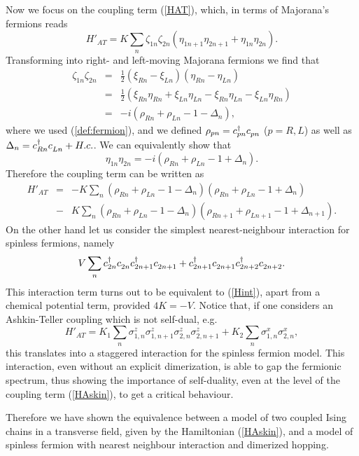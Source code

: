 Now we focus on the coupling term (\ref{HAT}), which, in terms of
Majorana's fermions reads
\[
H'_{AT} = K\sum_n \zeta_{1n}\zeta_{2n}\left(
\eta_{1n+1}\eta_{2n+1}+ \eta_{1n}\eta_{2n}\right).
\]
Transforming into right- and left-moving Majorana fermions we find that
\begin{eqnarray*}
\zeta_{1n}\zeta_{2n} &=& \frac{1}{2}
\left(\xi_{Rn}-\xi_{Ln}\right)
\left(\eta_{Rn}-\eta_{Ln}\right)\\
&=&\frac{1}{2}\left(\xi_{Rn}\eta_{Rn}+\xi_{Ln}\eta_{Ln}
-\xi_{Rn}\eta_{Ln}-\xi_{Ln}\eta_{Rn}\right)\\
&=&-i\left(\rho_{Rn}+\rho_{Ln}-1-\Delta_n\right),
\end{eqnarray*}
where we used (\ref{def:fermion}), and we defined
$\rho_{pn}=c^\dagger_{pn}c^\pdag_{pn}$ ($p=R,L$) as well as
$\Delta_n = c^\dagger_{Rn}c^\pdag_{Ln} + H.c.$.
We can equivalently show that
\[
\eta_{1n}\eta_{2n} = -i\left(\rho_{Rn}+\rho_{Ln}-1+\Delta_n\right).
\]
Therefore the coupling term can be written as
\begin{eqnarray}
H'_{AT} &=& - K\sum_n\left(\rho_{Rn}+\rho_{Ln}-1-\Delta_n\right)
\left(\rho_{Rn}+\rho_{Ln}-1+\Delta_n\right) \nonumber\\
&-& K\sum_n \left(\rho_{Rn}+\rho_{Ln}-1-\Delta_n\right)
\left(\rho_{Rn+1}+\rho_{Ln+1}-1+\Delta_{n+1}\right).
\label{Hint}
\end{eqnarray}
On the other hand let us consider the simplest nearest-neighbour
interaction for spinless fermions, namely
\[
V\sum_n c^\dagger_{2n}c^\pdag_{2n} c^\dagger_{2n+1}c^\pdag_{2n+1}
+ c^\dagger_{2n+1}c^\pdag_{2n+1} c^\dagger_{2n+2}c^\pdag_{2n+2}.
\]
This interaction term turns out to be equivalent to (\ref{Hint}),
apart from a chemical potential term, provided $4K=-V$.
Notice that, if one considers an Ashkin-Teller coupling which is
not self-dual, e.g.
\[
H'_{AT} = K_1\sum_n
\sigma^z_{1,n}\sigma^z_{1,n+1}\sigma^z_{2,n}\sigma^z_{2,n+1}
+ K_2\sum_n\sigma^x_{1,n}\sigma^x_{2,n},
\]
this translates into a staggered interaction for the spinless fermion
model. This interaction, even without an explicit dimerization, is
able to gap the fermionic spectrum, thus showing the importance of
self-duality, even at the level of the
coupling term (\ref{HAskin}), to get a critical behaviour.

Therefore we have shown the equivalence between a model of two coupled
Ising chains in a transverse field, given by the Hamiltonian
(\ref{HAskin}), and a model of spinless fermion with nearest
neighbour interaction and dimerized hopping.

